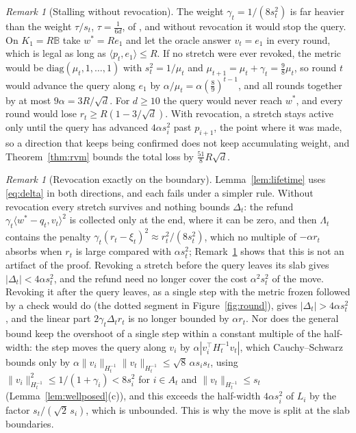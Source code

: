 \documentclass[11pt]{article}
\theoremstyle{plain}
\theoremstyle{definition}
\theoremstyle{remark}
\newtheorem{remark}[theorem]{Remark}
\newcommand{\Ball}{\mathbb{B}}
\newcommand{\wstar}{w^{\ast}}
\newcommand{\ip}[2]{\langle #1, #2\rangle}
\begin{document}
\begin{remark}[Stalling without revocation]\label{rem:stall}
The weight $\gamma_t=1/(8s_t^{2})$ is far heavier than the weight $\tau/s_t$, $\tau=\tfrac{1}{6d}$,
of \cite{Cai26}, and without revocation it would stop the query. On $K_1=R\Ball$ take $\wstar=Re_1$
and let the oracle answer $v_t=e_1$ in every round, which is legal as long as $\ip{p_t}{e_1}\le R$.
If no stretch were ever revoked, the metric would be $\mathrm{diag}(\mu_t,1,\dots,1)$ with
$s_t^{2}=1/\mu_t$ and $\mu_{t+1}=\mu_t+\gamma_t=\tfrac98\mu_t$, so round $t$ would advance the query
along $e_1$ by $\alpha/\mu_t=\alpha(\tfrac89)^{t-1}$, and all rounds together by at most
$9\alpha=3R/\sqrt d$. For $d\ge10$ the query would never reach $\wstar$, and every round would lose
$r_t\ge R(1-3/\sqrt d)$. With revocation, a stretch stays active only until the query has
advanced $4\alpha s_i^{2}$ past $p_{i+1}$, the point where it was made, so a direction that keeps
being confirmed does not keep accumulating weight, and Theorem~\ref{thm:rvm} bounds the total loss
by $\tfrac{51}{8}R\sqrt d$.
\end{remark}

\begin{remark}[Revocation exactly on the boundary]\label{rem:why}
Lemma~\ref{lem:lifetime} uses \eqref{eq:delta} in both directions, and each fails under a simpler
rule. Without revocation every stretch survives and nothing bounds $\Delta_t$: the refund
$\gamma_t\ip{\wstar-q_t}{v_t}^{2}$ is collected only at the end, where it can be zero, and then
$\Lambda_t$ contains the penalty $\gamma_t(r_t-\xi_t)^{2}\approx r_t^{2}/(8s_t^{2})$, which no
multiple of $-\alpha r_t$ absorbs when $r_t$ is large compared with $\alpha s_t^{2}$;
Remark~\ref{rem:stall} shows that this is not an artifact of the proof. Revoking a stretch before
the query leaves its slab gives $|\Delta_t|<4\alpha s_t^{2}$, and the refund need no longer cover
the cost $\alpha^{2}s_t^{2}$ of the move. Revoking it after the query leaves, as a single step with
the metric frozen followed by a check would do (the dotted segment in Figure~\ref{fig:round}),
gives $|\Delta_t|>4\alpha s_t^{2}$, and the linear part
$2\gamma_t\Delta_tr_t$ is no longer bounded by $\alpha r_t$. Nor does the general bound keep the
overshoot of a single step within a constant multiple of the half-width: the step moves the query
along $v_i$ by $\alpha|v_i^{\top}H_t^{-1}v_t|$, which Cauchy--Schwarz bounds only by
$\alpha\|v_i\|_{H_t^{-1}}\|v_t\|_{H_t^{-1}}\le\sqrt8\,\alpha s_is_t$, using
$\|v_i\|^{2}_{H_t^{-1}}\le1/(1+\gamma_i)<8s_i^{2}$ for $i\in A_t$ and $\|v_t\|_{H_t^{-1}}\le s_t$
(Lemma~\ref{lem:wellposed}(c)), and this exceeds the half-width $4\alpha s_i^{2}$ of $L_i$ by the
factor $s_t/(\sqrt2\,s_i)$, which is unbounded. This is why the move is split at the slab
boundaries.
\end{remark}
\end{document}
